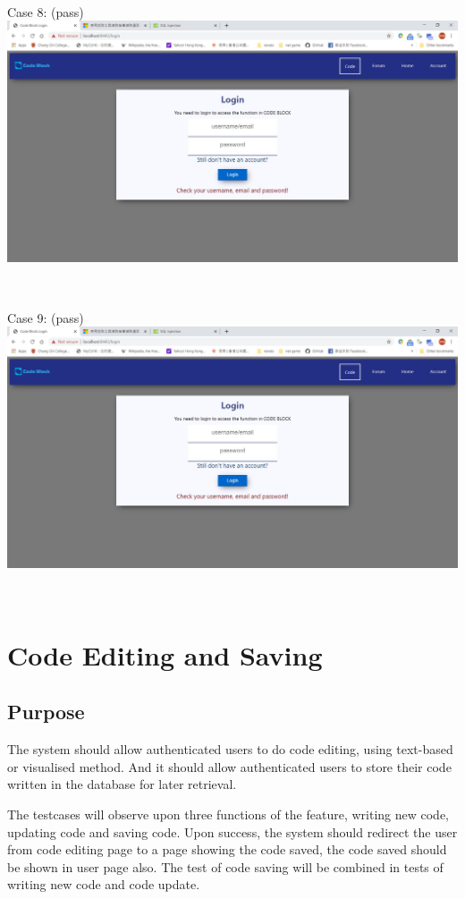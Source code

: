 ~

Case 8: (pass)\\
\includegraphics[scale=0.45]{Doc/Pics/case-5-2-8}

~

Case 9: (pass)\\
\includegraphics[scale=0.45]{Doc/Pics/case-5-2-9}

~

\section{Code Editing and Saving}
\subsection{Purpose}
The system should allow authenticated users to do code editing, using text-based or visualised method. And it should allow authenticated users to store their code written in the database for later retrieval.

The testcases will observe upon three functions of the feature, writing new code, updating code and saving code. Upon success, the system should redirect the user from code editing page to a page showing the code saved, the code saved should be shown in user page also. The test of code saving will be combined in tests of writing new code and code update.


